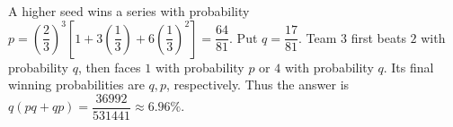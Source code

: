 A higher seed wins a series with probability $p=(\dfrac{2}{3})^3[1+3(\dfrac{1}{3})+6(\dfrac{1}{3})^2]=\dfrac{64}{81}$. Put $q=\dfrac{17}{81}$. Team $3$ first beats $2$ with probability $q$, then faces $1$ with probability $p$ or $4$ with probability $q$. Its final winning probabilities are $q,p$, respectively. Thus the answer is $q(pq+qp)=\boxed{\dfrac{36992}{531441}\approx6.96\%}$.
